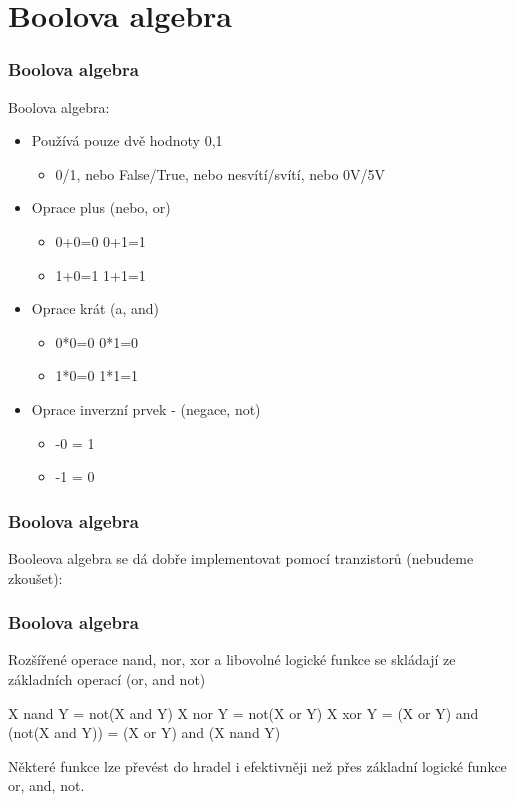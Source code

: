 \documentclass{beamer}
\begin{document}
\section{Boolova algebra}
\begin{frame}
\frametitle{Boolova algebra}

Boolova algebra:
\begin{itemize}
\item Používá pouze dvě hodnoty 0,1
\begin{itemize}
\item 0/1, nebo False/True, nebo nesvítí/svítí, nebo 0V/5V
\end{itemize}
\item Oprace plus (nebo, or)
\begin{itemize}
\item 0+0=0   0+1=1
\item 1+0=1   1+1=1
\end{itemize}
\item Oprace krát (a, and)
\begin{itemize}
\item 0*0=0   0*1=0
\item 1*0=0   1*1=1
\end{itemize}
\item Oprace inverzní prvek - (negace, not)
\begin{itemize}
\item -0 = 1
\item -1 = 0
\end{itemize}
\end{itemize}
\end{frame}


\begin{frame}
\frametitle{Boolova algebra}

Booleova algebra se dá dobře implementovat pomocí tranzistorů (nebudeme zkoušet):

\end{frame}

\begin{frame}
\frametitle{Boolova algebra}

Rozšířené operace nand, nor, xor a libovolné logické funkce se skládají ze základních operací (or, and not)

X nand Y = not(X and Y)
X nor Y = not(X or Y)
X xor Y = (X or Y) and (not(X and Y)) = (X or Y) and (X nand Y)

Některé funkce lze převést do hradel i efektivněji než přes základní logické funkce or, and, not.
\end{frame}
\end{document}
